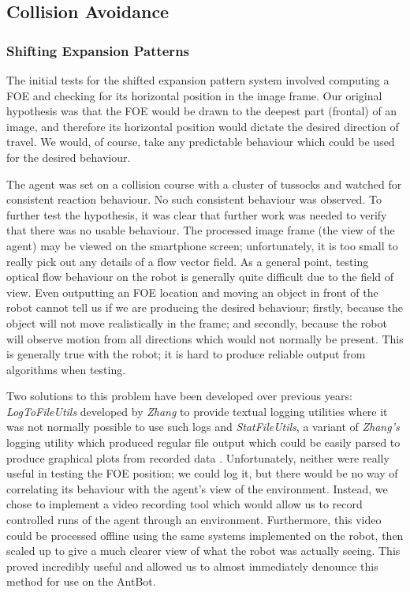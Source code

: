 \documentclass[a4paper,11pt,twoside,openright]{article}
\begin{document}
\subsection{Collision Avoidance}
\subsubsection{Shifting Expansion Patterns}
The initial tests for the shifted expansion pattern system involved computing
a FOE and checking for its horizontal position in the image frame. Our
original hypothesis was that the FOE would be drawn
to the deepest part (frontal) of an image, and therefore its horizontal position
would dictate the desired direction of travel. We would, of course, take any
predictable behaviour which could be used for the desired behaviour.
\newline\par

The agent was set on a collision course with a cluster of tussocks and watched
for consistent reaction behaviour. No such consistent behaviour was observed.
To further test the hypothesis, it was clear that further work was needed to
verify that there was no usable behaviour. The processed image frame (the view
of the agent) may be viewed on the smartphone screen; unfortunately, it is too
small to really pick out any details of a flow vector field. As a general point,
testing optical flow behaviour on the robot is generally quite difficult due to
the field of view. Even outputting an FOE location and moving an object in front
of the robot cannot tell us if we are producing the desired behaviour; firstly,
because the object will not move realistically in the frame; and secondly,
because the robot will observe motion from all directions which would not
normally be present. This is generally true with the robot; it is hard to produce
reliable output from algorithms when testing.
\newline\par

Two solutions to this problem have been developed over previous years:
\textit{LogToFileUtils} developed by \textit{Zhang} to provide textual logging
utilities where it was not normally possible to use such logs \cite{Zhang2017}
and \textit{StatFileUtils}, a variant of \textit{Zhang's} logging utility which
produced regular file output which could be easily parsed to produce graphical
plots from recorded data \cite{Mitchell2018}. Unfortunately, neither were really
useful in testing the FOE position; we could log it, but there would be no way
of correlating its behaviour with the agent's view of the environment. Instead,
we chose to implement a video recording tool which would allow us to record
controlled runs of the agent through an environment. Furthermore, this video
could be processed offline using the same systems implemented on the robot, then
scaled up to give a much clearer view of what the robot was actually seeing.
This proved incredibly useful and allowed us to almost immediately denounce this
method for use on the AntBot.
\newline\par
\end{document}
